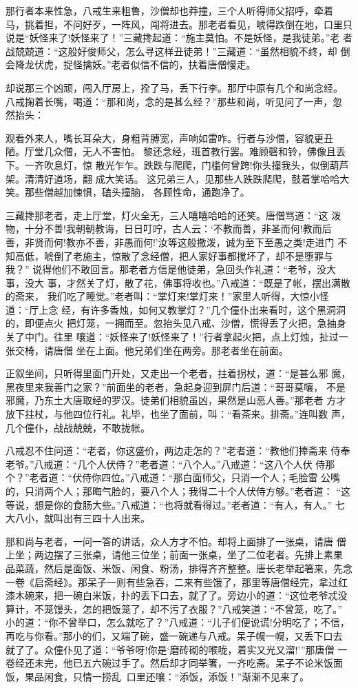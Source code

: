 那行者本来性急，八戒生来粗鲁，沙僧却也莽撞，三个人听得师父招呼，牵着
马，挑着担，不问好歹，一阵风，闯将进去。那老者看见，唬得跌倒在地，口里只
说是“妖怪来了!妖怪来了！”三藏搀起道：“施主莫怕。不是妖怪，是我徒弟。”老
者战兢兢道：“这般好俊师父，怎么寻这样丑徒弟！”三藏道：“虽然相貌不终，却
倒会降龙伏虎，捉怪擒妖。”老者似信不信的，扶着唐僧慢走。

却说那三个凶顽，闯入厅房上，拴了马，丢下行李。那厅中原有几个和尚念经。
八戒掬着长嘴，喝道：“那和尚，念的是甚么经？”那些和尚，听见问了一声，忽
然抬头：

观看外来人，嘴长耳朵大，身粗背膊宽，声响如雷咋。行者与沙僧，容貌更丑
陋。厅堂几众僧，无人不害怕。黎还念经，班首教行罢。难顾磬和铃，佛像且丢
下。一齐吹息灯，惊
散光乍乍。跌跌与爬爬，门槛何曾跨!你头撞我头，似倒葫芦架。清清好道场，翻
成大笑话。
这兄弟三人，见那些人跌跌爬爬，鼓着掌哈哈大笑。那些僧越加悚惧，磕头撞脑，
各顾性命，通跑净了。

三藏搀那老者，走上厅堂，灯火全无，三人嘻嘻哈哈的还笑。唐僧骂道：“这
泼物，十分不善!我朝朝教诲，日日叮咛，古人云：‘不教而善，非圣而何!教而后
善，非贤而何!教亦不善，非愚而何!’汝等这般撒泼，诚为至下至愚之类!走进门
不知高低，唬倒了老施主，惊散了念经僧，把人家好事都搅坏了，却不是堕罪与我？”
说得他们不敢回言。那老者方信是他徒弟，急回头作礼道：“老爷，没大事，没大
事，才然关了灯，散了花，佛事将收也。”八戒道：“既是了帐，摆出满散的斋来，
我们吃了睡觉。”老者叫：“掌灯来!掌灯来！”家里人听得，大惊小怪道：“厅上念
经，有许多香烛，如何又教掌灯？”几个僮仆出来看时，这个黑洞洞的，即便点火
把灯笼，一拥而至。忽抬头见八戒、沙僧，慌得丢了火把，急抽身关了中门。往里
嚷道：“妖怪来了!妖怪来了！”行者拿起火把，点上灯烛，扯过一张交椅，请唐僧
坐在上面。他兄弟们坐在两旁。那老者坐在前面。

正叙坐间，只听得里面门开处，又走出一个老者，拄着拐杖，道：“是甚么邪
魔，黑夜里来我善门之家？”前面坐的老者，急起身迎到屏门后道：“哥哥莫嚷，
不是邪魔，乃东土大唐取经的罗汉。徒弟们相貌虽凶，果然是山恶人善。”那老者
方才放下拄杖，与他四位行礼。礼毕，也坐了面前，叫：“看茶来。排斋。”连叫数
声，几个僮仆，战战兢兢，不敢拢帐。

八戒忍不住问道：“老者，你这盛价，两边走怎的？”老者道：“教他们捧斋来
侍奉老爷。”八戒道：“几个人伏侍？”老者道：“八个人。”八戒道：“这八个人伏
侍那个？”老者道：“伏侍你四位。”八戒道：“那白面师父，只消一个人；毛脸雷
公嘴的，只消两个人；那晦气脸的，要八个人；我得二十个人伏侍方够。”老者道：
“这等说，想是你的食肠大些。”八戒道：“也将就看得过。”老者道：“有人，有人。”
七大八小，就叫出有三四十人出来。

那和尚与老者，一问一答的讲话，众人方才不怕。却将上面排了一张桌，请唐
僧上坐；两边摆了三张桌，请他三位坐；前面一张桌，坐了二位老者。先排上素果
品菜蔬，然后是面饭、米饭、闲食、粉汤，排得齐齐整整。唐长老举起箸来，先念
一卷《启斋经》。那呆子一则有些急吞，二来有些饿了，那里等唐僧经完，拿过红
漆木碗来，把一碗白米饭，扑的丢下口去，就了了。旁边小的道：“这位老爷忒没
算计，不笼馒头，怎的把饭笼了，却不污了衣服？”八戒笑道：“不曾笼，吃了。”
小的道：“你不曾举口，怎么就吃了？”八戒道：“儿子们便说谎!分明吃了；不信，
再吃与你看。”那小的们，又端了碗，盛一碗递与八戒。呆子幌一幌，又丢下口去
就了了。众僮仆见了道：“爷爷呀!你是‘磨砖砌的喉咙，着实又光又溜!’”那唐僧
一卷经还未完，他已五六碗过手了。然后却才同举箸，一齐吃斋。呆子不论米饭面
饭，果品闲食，只情一捞乱，口里还嚷：“添饭，添饭！”渐渐不见来了。

